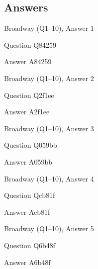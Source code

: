 \documentclass[11pt]{beamer}
\begin{document}
\subsection{Answers}

\begin{frame}[t]{Broadway (Q1--10), Answer 1}
\vspace{2em}
\begin{block}{Question}
Q84259
\end{block}
\pause{}
\begin{block}{Answer}
A84259
\end{block}
\end{frame}
    

\begin{frame}[t]{Broadway (Q1--10), Answer 2}
\vspace{2em}
\begin{block}{Question}
Q2f1ee
\end{block}
\pause{}
\begin{block}{Answer}
A2f1ee
\end{block}
\end{frame}
    

\begin{frame}[t]{Broadway (Q1--10), Answer 3}
\vspace{2em}
\begin{block}{Question}
Q059bb
\end{block}
\pause{}
\begin{block}{Answer}
A059bb
\end{block}
\end{frame}
    

\begin{frame}[t]{Broadway (Q1--10), Answer 4}
\vspace{2em}
\begin{block}{Question}
Qcb81f
\end{block}
\pause{}
\begin{block}{Answer}
Acb81f
\end{block}
\end{frame}
    

\begin{frame}[t]{Broadway (Q1--10), Answer 5}
\vspace{2em}
\begin{block}{Question}
Q6b48f
\end{block}
\pause{}
\begin{block}{Answer}
A6b48f
\end{block}
\end{frame}
    
\end{document}
